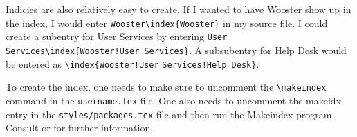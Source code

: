 Indicies are also relatively easy to create. If I wanted to have Wooster show up in the index, I would enter \verb|Wooster\index{Wooster}| in my source file. I could create a subentry for User Services by entering \verb|User Services|\verb|\index{Wooster!User Services}|. A subsubentry for Help Desk would be entered as \verb|\index{Wooster!User| \verb|Services!Help Desk}|.

To create the index, one needs to make sure to uncomment the \verb|\makeindex| command in the \texttt{username.tex} file. One also needs to uncomment the makeidx entry in the \verb|styles/packages.tex| file and then run the Makeindex program. Consult \citet{kd03} or \citet{mgbcr04} for further information.